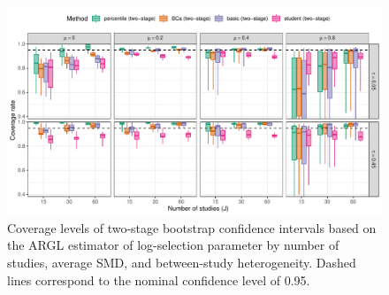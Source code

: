 \documentclass[
  american,
  man, donotrepeattitle,floatsintext]{apa7}
\begin{document}
\begin{figure}
\includegraphics{step-function-selection-models-with-dependent-effects_files/figure-latex/ARGL-zeta-coverage-two-stage-1} \caption{Coverage levels of two-stage bootstrap confidence intervals based on the ARGL estimator of log-selection parameter by number of studies, average SMD, and between-study heterogeneity. Dashed lines correspond to the nominal confidence level of 0.95.}\label{fig:ARGL-zeta-coverage-two-stage}
\end{figure}
\end{document}

